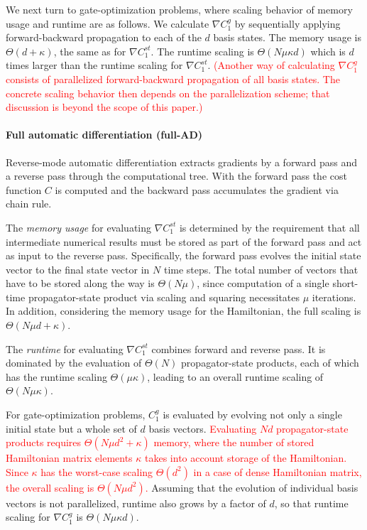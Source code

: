 \documentclass[letterpaper,10pt]{iopart}
\newcommand\revise[1]{\textcolor{red}{#1}}
\begin{document}
We next turn to gate-optimization problems, where scaling behavior of memory usage and runtime are as follows. We calculate $\nabla C_1^{ g}$ by sequentially 
applying forward-backward propagation to each of the $d$ basis states. The memory usage is $\Theta(d+\kappa)$, the same as for $\nabla C_1^{st}$. The runtime scaling is $\Theta(N\mu\kappa d)$ which is $d$ times larger than the runtime scaling for $\nabla C_1^{st}$. \revise{(Another way of calculating $\nabla C_1^{ g}$ consists of parallelized forward-backward propagation of all basis states. The concrete scaling behavior then depends on the parallelization scheme; that discussion is beyond the scope of this paper.)}



\paragraph{Full automatic differentiation (full-AD)}
Reverse-mode automatic differentiation extracts gradients by a forward pass and a reverse pass through the computational tree. With the forward pass the cost function $C$ is computed and the backward pass accumulates the gradient via chain rule.

The \textit{memory usage} for evaluating $\nabla C_1^{st}$ is determined by the requirement that all intermediate numerical results must be stored as part of the forward pass and act as input to the reverse pass. Specifically, the forward pass evolves the initial state vector to the final state vector in $N$ time steps. The total number of vectors that have to be stored along the way is $\Theta
(N\mu)$, since computation of a single short-time propagator-state product via scaling and squaring necessitates $\mu$ iterations. In addition, considering the memory usage for the Hamiltonian, the full scaling is $\Theta(N\mu d +\kappa)$. 

The \textit{runtime} for evaluating $\nabla C_1^{st}$ combines forward and reverse pass. It is dominated by the evaluation of $\Theta(N)$ propagator-state products, each of which has the runtime scaling $\Theta(\mu\kappa)$, leading to an overall runtime scaling of $\Theta(N\mu \kappa )$.

For gate-optimization problems, $C_1^{ g}$ is evaluated by evolving not only a single initial state but a whole set of $d$ basis vectors. \revise{Evaluating $Nd$ propagator-state products requires $\Theta(N\mu d^2+\kappa)$ memory, where the number of stored Hamiltonian matrix elements  $\kappa$ takes into account storage of the Hamiltonian. Since $\kappa$ has the worst-case scaling $\Theta(d^2)$ in a case of dense Hamiltonian matrix, the overall scaling is $\Theta(N\mu d^2)$.} Assuming that the evolution of individual basis vectors is not parallelized, runtime also grows by a factor of $d$, so that runtime scaling for $\nabla C_1^{ g}$ is $\Theta(N\mu\kappa d)$.
\end{document}
